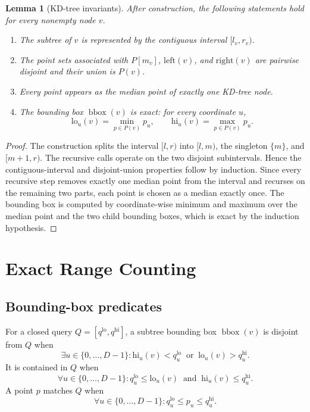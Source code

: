 \documentclass[11pt]{article}
\theoremstyle{definition}
\theoremstyle{plain}
\newtheorem{lemma}{Lemma}[section]
\theoremstyle{remark}
\DeclareMathOperator{\bbox}{bbox}
\newcommand{\lo}{\mathrm{lo}}
\newcommand{\hi}{\mathrm{hi}}
\newcommand{\lch}{\mathrm{left}}
\newcommand{\rch}{\mathrm{right}}
\begin{document}
\begin{lemma}[KD-tree invariants]
After construction, the following statements hold for every nonempty node $v$.
\begin{enumerate}[leftmargin=2em]
  \item The subtree of $v$ is represented by the contiguous interval $[l_v,r_v)$.
  \item The point sets associated with $P[m_v]$, $\lch(v)$, and $\rch(v)$ are pairwise
        disjoint and their union is $P(v)$.
  \item Every point appears as the median point of exactly one KD-tree node.
  \item The bounding box $\bbox(v)$ is exact: for every coordinate $u$,
        \[
          \lo_u(v)=\min_{p\in P(v)}p_u,
          \qquad
          \hi_u(v)=\max_{p\in P(v)}p_u.
        \]
\end{enumerate}
\end{lemma}

\begin{proof}
The construction splits the interval $[l,r)$ into $[l,m)$, the singleton $\{m\}$, and
$[m+1,r)$.  The recursive calls operate on the two disjoint subintervals.  Hence the
contiguous-interval and disjoint-union properties follow by induction.  Since every recursive
step removes exactly one median point from the interval and recurses on the remaining two
parts, each point is chosen as a median exactly once.  The bounding box is computed by
coordinate-wise minimum and maximum over the median point and the two child bounding boxes,
which is exact by the induction hypothesis.
\end{proof}

\section{Exact Range Counting}

\subsection{Bounding-box predicates}

For a closed query $Q=[q^{\lo},q^{\hi}]$, a subtree bounding box $\bbox(v)$ is disjoint
from $Q$ when
\[
  \exists u\in\{0,\ldots,D-1\}:
  \hi_u(v)<q^{\lo}_u\ \text{ or }\ \lo_u(v)>q^{\hi}_u.
\]
It is contained in $Q$ when
\[
  \forall u\in\{0,\ldots,D-1\}:
  q^{\lo}_u\le\lo_u(v)\ \text{ and }\ \hi_u(v)\le q^{\hi}_u.
\]
A point $p$ matches $Q$ when
\[
  \forall u\in\{0,\ldots,D-1\}: q^{\lo}_u\le p_u\le q^{\hi}_u.
\]
\end{document}
